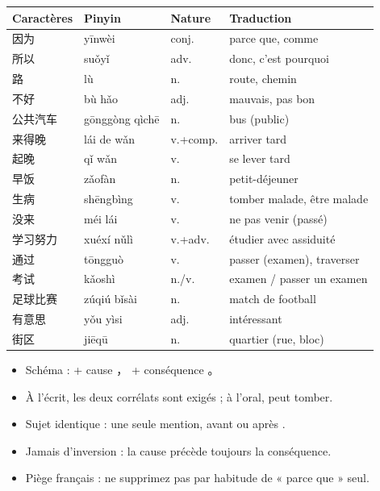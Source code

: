 \documentclass[11pt]{article}
\newcommand{\zh}[1]{\ifmmode\text{#1}\else{#1}\fi}
\begin{document}
\begin{definition}
\begin{center}
\begin{tabularx}{\linewidth}{|X|X|X|X|}
\hline
\rowcolor{popblueL} \textbf{Caractères} & \textbf{Pinyin} & \textbf{Nature} & \textbf{Traduction} \\
\hline
因为 & yīnwèi & conj. & parce que, comme \\
\hline
所以 & suǒyǐ & adv. & donc, c'est pourquoi \\
\hline
路 & lù & n. & route, chemin \\
\hline
不好 & bù hǎo & adj. & mauvais, pas bon \\
\hline
公共汽车 & gōnggòng qìchē & n. & bus (public) \\
\hline
来得晚 & lái de wǎn & v.+comp. & arriver tard \\
\hline
起晚 & qǐ wǎn & v. & se lever tard \\
\hline
早饭 & zǎofàn & n. & petit-déjeuner \\
\hline
生病 & shēngbìng & v. & tomber malade, être malade \\
\hline
没来 & méi lái & v. & ne pas venir (passé) \\
\hline
学习努力 & xuéxí nǔlì & v.+adv. & étudier avec assiduité \\
\hline
通过 & tōngguò & v. & passer (examen), traverser \\
\hline
考试 & kǎoshì & n./v. & examen / passer un examen \\
\hline
足球比赛 & zúqiú bǐsài & n. & match de football \\
\hline
有意思 & yǒu yìsi & adj. & intéressant \\
\hline
街区 & jiēqū & n. & quartier (rue, bloc) \\
\hline
\end{tabularx}
\end{center}
\end{definition}

\begin{aretenir}
\begin{itemize}
\item Schéma : \zh{因为} + cause ，\zh{所以} + conséquence 。
\item À l'écrit, les deux corrélats sont exigés ; à l'oral, \zh{所以} peut tomber.
\item Sujet identique : une seule mention, avant ou après \zh{因为}.
\item Jamais d'inversion : la cause précède toujours la conséquence.
\item Piège français : ne supprimez pas \zh{所以} par habitude de « parce que » seul.
\end{itemize}
\end{aretenir}
\end{document}
